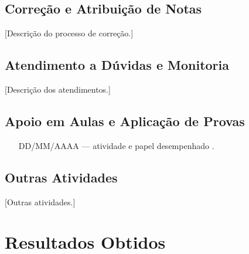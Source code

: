 \documentclass[12pt]{article}
\newif\ifmostrarinstrucoes
\newcommand{\instrucao}[1]{%
  \ifmostrarinstrucoes
  \begin{tcolorbox}[colback=instrbg, colframe=dccblue, arc=2mm, boxrule=0.6pt,
    title=\textbf{INSTRUÇÃO (apagar na versão final)}, fonttitle=\small]
  \small #1
  \end{tcolorbox}
  \fi}
\begin{document}
\subsection{Correção e Atribuição de Notas}
\instrucao{Explique o método de correção (manual, automatizado, rubricas), prazos, ferramentas usadas, política de feedback e como as notas foram lançadas. Se houve verificação de integridade acadêmica, descreva a ferramenta e o critério adotado, \textbf{sem identificar alunos}.}
[Descrição do processo de correção.]

\subsection{Atendimento a Dúvidas e Monitoria}
\instrucao{Informe a modalidade (presencial, remota ou híbrida), canais utilizados, frequência e principais temas das dúvidas.}
[Descrição dos atendimentos.]

\subsection{Apoio em Aulas e Aplicação de Provas}
\instrucao{Liste as aulas práticas/laboratórios e provas em que você atuou, com datas e natureza do apoio.}
\begin{itemize}[leftmargin=*]
    \item [DD/MM/AAAA --- atividade e papel desempenhado].
\end{itemize}

\subsection{Outras Atividades}
\instrucao{Elaboração de materiais didáticos, ambientes de teste, comunicados aos alunos etc. Remova se não houver.}
[Outras atividades.]

\newpage
\section{Resultados Obtidos}\label{sec:resultados}
\instrucao{Item 3 das Diretrizes: apresente evidências do resultado do seu trabalho (estatísticas da turma, evolução entre avaliações, taxa de entrega, desempenho médio, observações qualitativas). Use dados agregados --- \textbf{não inclua nomes nem matrículas de alunos}.}
\end{document}
